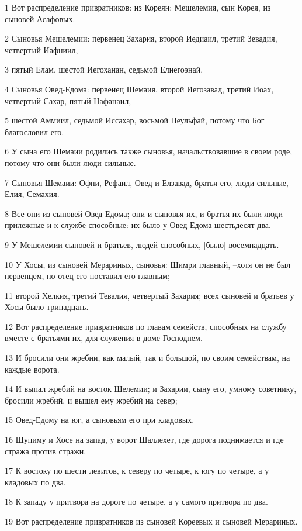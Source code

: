 \par 1 Вот распределение привратников: из Кореян: Мешелемия, сын Корея, из сыновей Асафовых.
\par 2 Сыновья Мешелемии: первенец Захария, второй Иедиаил, третий Зевадия, четвертый Иафниил,
\par 3 пятый Елам, шестой Иегоханан, седьмой Елиегоэнай.
\par 4 Сыновья Овед-Едома: первенец Шемаия, второй Иегозавад, третий Иоах, четвертый Сахар, пятый Нафанаил,
\par 5 шестой Аммиил, седьмой Иссахар, восьмой Пеульфай, потому что Бог благословил его.
\par 6 У сына его Шемаии родились также сыновья, начальствовавшие в своем роде, потому что они были люди сильные.
\par 7 Сыновья Шемаии: Офни, Рефаил, Овед и Елзавад, братья его, люди сильные, Елия, Семахия.
\par 8 Все они из сыновей Овед-Едома; они и сыновья их, и братья их были люди прилежные и к службе способные: их было у Овед-Едома шестьдесят два.
\par 9 У Мешелемии сыновей и братьев, людей способных, [было] восемнадцать.
\par 10 У Хосы, из сыновей Мерариных, сыновья: Шимри главный, --хотя он не был первенцем, но отец его поставил его главным;
\par 11 второй Хелкия, третий Тевалия, четвертый Захария; всех сыновей и братьев у Хосы было тринадцать.
\par 12 Вот распределение привратников по главам семейств, способных на службу вместе с братьями их, для служения в доме Господнем.
\par 13 И бросили они жребии, как малый, так и большой, по своим семействам, на каждые ворота.
\par 14 И выпал жребий на восток Шелемии; и Захарии, сыну его, умному советнику, бросили жребий, и вышел ему жребий на север;
\par 15 Овед-Едому на юг, а сыновьям его при кладовых.
\par 16 Шупиму и Хосе на запад, у ворот Шаллехет, где дорога поднимается и где стража против стражи.
\par 17 К востоку по шести левитов, к северу по четыре, к югу по четыре, а у кладовых по два.
\par 18 К западу у притвора на дороге по четыре, а у самого притвора по два.
\par 19 Вот распределение привратников из сыновей Кореевых и сыновей Мерариных.
